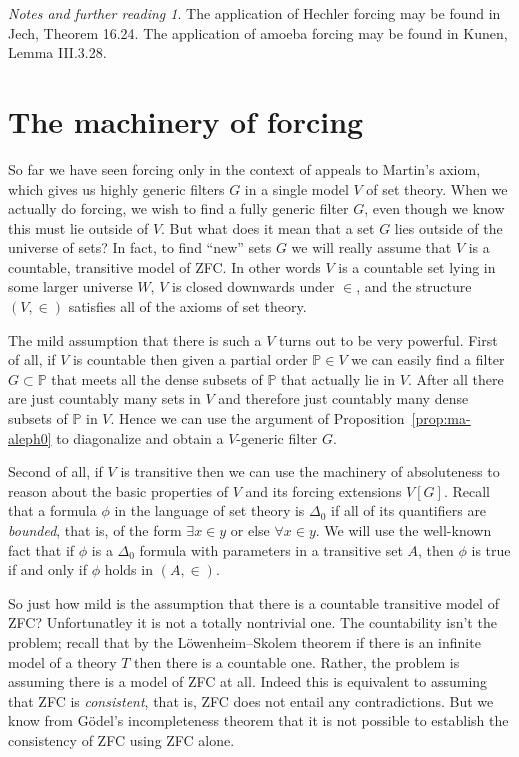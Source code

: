 \documentclass[11pt,oneside,a4paper]{amsbook}
\newcommand{\PP}{\mathbb P}
\theoremstyle{definition}
\theoremstyle{plain}
\theoremstyle{definition}
\theoremstyle{remark}
\newtheorem*{notes}{Notes and further reading}
\numberwithin{equation}{section}
\numberwithin{figure}{section}
\begin{document}
\begin{notes}
  The application of Hechler forcing may be found in Jech, Theorem 16.24. The application of amoeba forcing may be found in Kunen, Lemma III.3.28.
\end{notes}


\newpage
\section{The machinery of forcing}

So far we have seen forcing only in the context of appeals to Martin's axiom, which gives us highly generic filters $G$ in a single model $V$ of set theory. When we actually do forcing, we wish to find a fully generic filter $G$, even though we know this must lie outside of $V$. But what does it mean that a set $G$ lies outside of the universe of sets? In fact, to find ``new'' sets $G$ we will really assume that $V$ is a countable, transitive model of ZFC. In other words $V$ is a countable set lying in some larger universe $W$, $V$ is closed downwards under $\in$, and the structure $(V,\in)$ satisfies all of the axioms of set theory.

The mild assumption that there is such a $V$ turns out to be very powerful. First of all, if $V$ is countable then given a partial order $\PP\in V$ we can easily find a filter $G\subset\PP$ that meets all the dense subsets of $\PP$ that actually lie in $V$. After all there are just countably many sets in $V$ and therefore just countably many dense subsets of $\mathbb P$ in $V$. Hence we can use the argument of Proposition~\ref{prop:ma-aleph0} to diagonalize and obtain a $V$-generic filter $G$.

Second of all, if $V$ is transitive then we can use the machinery of absoluteness to reason about the basic properties of $V$ and its forcing extensions $V[G]$. Recall that a formula $\phi$ in the language of set theory is $\Delta_0$ if all of its quantifiers are \emph{bounded}, that is, of the form $\exists x\in y$ or else $\forall x\in y$. We will use the well-known fact that if $\phi$ is a $\Delta_0$ formula with parameters in a transitive set $A$, then $\phi$ is true if and only if $\phi$ holds in $(A,\in)$.

So just how mild is the assumption that there is a countable transitive model of ZFC? Unfortunatley it is not a totally nontrivial one. The countability isn't the problem; recall that by the L\"owenheim--Skolem theorem if there is an infinite model of a theory $T$ then there is a countable one. Rather, the problem is assuming there is a model of ZFC at all. Indeed this is equivalent to assuming that ZFC is \emph{consistent}, that is, ZFC does not entail any contradictions. But we know from G\"odel's incompleteness theorem that it is not possible to establish the consistency of ZFC using ZFC alone.
\end{document}
